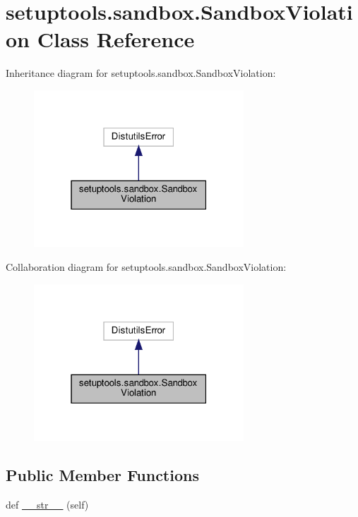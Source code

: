 \hypertarget{classsetuptools_1_1sandbox_1_1SandboxViolation}{}\section{setuptools.\+sandbox.\+Sandbox\+Violation Class Reference}
\label{classsetuptools_1_1sandbox_1_1SandboxViolation}


Inheritance diagram for setuptools.\+sandbox.\+Sandbox\+Violation\+:
\nopagebreak
\begin{figure}[H]
\begin{center}
\leavevmode
\includegraphics[width=223pt]{classsetuptools_1_1sandbox_1_1SandboxViolation__inherit__graph}
\end{center}
\end{figure}


Collaboration diagram for setuptools.\+sandbox.\+Sandbox\+Violation\+:
\nopagebreak
\begin{figure}[H]
\begin{center}
\leavevmode
\includegraphics[width=223pt]{classsetuptools_1_1sandbox_1_1SandboxViolation__coll__graph}
\end{center}
\end{figure}
\subsection*{Public Member Functions}
\begin{DoxyCompactItemize}
\item 
def \hyperlink{classsetuptools_1_1sandbox_1_1SandboxViolation_afb6e074e1ead4616653fcb9ca1dac655}{\+\_\+\+\_\+str\+\_\+\+\_\+} (self)
\end{DoxyCompactItemize}
